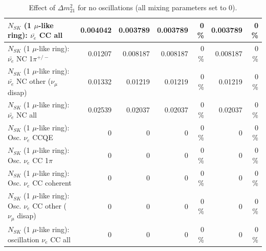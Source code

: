 \begin{table}
\begin{tabular}{| l | r | r | r  r | r  r |}
                            $N_{SK}$ (1 $\mu$-like ring): $\bar{\nu_{e}}$ CC all &        0.004042 &        0.003789 &        0.003789 &        0 \%  &        0.003789 &        0 \%  \\ 
\hline
                     $N_{SK}$ (1 $\mu$-like ring): $\bar{\nu_e}$ NC 1$\pi^{+/-}$ &         0.01207 &        0.008187 &        0.008187 &        0 \%  &        0.008187 &        0 \%  \\ 
          $N_{SK}$ (1 $\mu$-like ring): $\bar{\nu_e}$ NC other ($\nu_\mu$ disap) &         0.01332 &         0.01219 &         0.01219 &        0 \%  &         0.01219 &        0 \%  \\ 
                            $N_{SK}$ (1 $\mu$-like ring): $\bar{\nu_{e}}$ NC all &         0.02539 &         0.02037 &         0.02037 &        0 \%  &         0.02037 &        0 \%  \\ 
\hline
\hline
\hline
                                 $N_{SK}$ (1 $\mu$-like ring): Osc. $\nu_e$ CCQE &               0 &               0 &               0 &        0 \%  &               0 &        0 \%  \\ 
                            $N_{SK}$ (1 $\mu$-like ring): Osc. $\nu_e$ CC 1$\pi$ &               0 &               0 &               0 &        0 \%  &               0 &        0 \%  \\ 
                          $N_{SK}$ (1 $\mu$-like ring): Osc. $\nu_e$ CC coherent &               0 &               0 &               0 &        0 \%  &               0 &        0 \%  \\ 
           $N_{SK}$ (1 $\mu$-like ring): Osc. $\nu_e$ CC other ($\nu_\mu$ disap) &               0 &               0 &               0 &        0 \%  &               0 &        0 \%  \\ 
                        $N_{SK}$ (1 $\mu$-like ring): oscillation $\nu_e$ CC all &               0 &               0 &               0 &        0 \%  &               0 &        0 \%  \\ 
\hline
\hline
\end{tabular}
\caption{ Effect of $\Delta m^2_{21}$ for no oscillations (all mixing parameters set to 0). }
\label{tab:num_dm12sq_1RmuT_3f_osc_t13:0}
\end{table}
\clearpage
